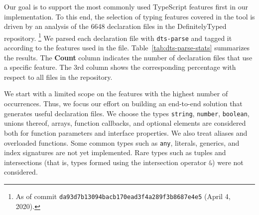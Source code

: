 \documentclass[sigplan,screen]{acmart}
\newcommand{\figref}[1]{Figure~\ref{#1}}
\begin{document}



Our goal is to support the  most commonly used TypeScript
features first in our implementation. To this end,
the selection of typing features covered in the tool is driven by
an analysis of the 6648 declaration files in
the DefinitelyTyped repository. \footnote{As of commit
  \texttt{da93d7b13094bacb170ead3f4a289f3b8687e4e5} (April 4, 2020).}
We parsed each declaration file with 
\texttt{dts-parse} and tagged it according to the features used in the file.
Table~\ref{tab:dts-parse-stats} summarizes the results.
The \textbf{Count} column indicates the number of declaration files that use a
specific feature. The 3rd column shows the corresponding
percentage with respect to all files in the repository. 

We start with a limited scope on the features with the highest number of
occurrences. Thus, we focus our effort on building an
end-to-end solution that generates useful declaration files. We choose
the types \texttt{string}, \texttt{number}, \texttt{boolean}, unions
thereof, arrays, function callbacks, and optional elements are considered
both for function parameters and interface properties. We also
treat aliases and overloaded functions.
Some common types such as \texttt{any}, literals, generics, and index
signatures are not yet implemented. 
Rare types such as tuples and intersections (that
is, types formed using the intersection operator
\lstinline[language=TypeScript]/&/) were not considered. 
\end{document}

